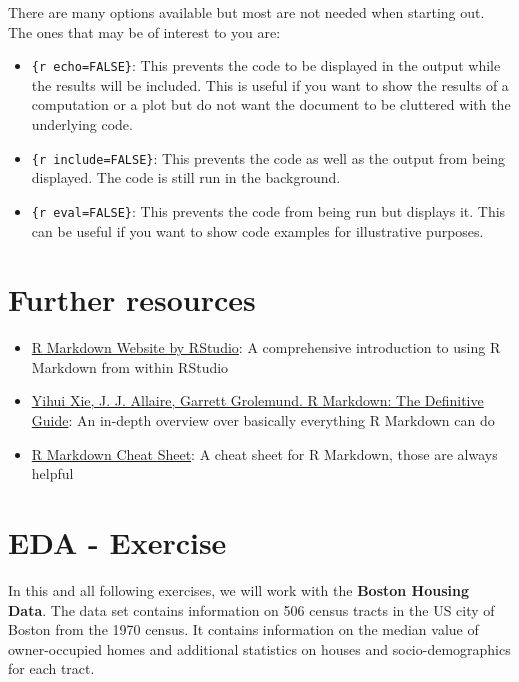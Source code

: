 \documentclass[
]{book}
\providecommand{\tightlist}{%
  \setlength{\itemsep}{0pt}\setlength{\parskip}{0pt}}
\begin{document}
There are many options available but most are not needed when starting out. The ones that may be of interest to you are:

\begin{itemize}
\tightlist
\item
  \texttt{\{r\ echo=FALSE\}}: This prevents the code to be displayed in the output while the results will be included. This is useful if you want to show the results of a computation or a plot but do not want the document to be cluttered with the underlying code.
\item
  \texttt{\{r\ include=FALSE\}}: This prevents the code as well as the output from being displayed. The code is still run in the background.
\item
  \texttt{\{r\ eval=FALSE\}}: This prevents the code from being run but displays it. This can be useful if you want to show code examples for illustrative purposes.
\end{itemize}

\hypertarget{further-resources-1}{%
\section{Further resources}\label{further-resources-1}}

\begin{itemize}
\tightlist
\item
  \href{https://rmarkdown.rstudio.com/lesson-1.html}{R Markdown Website by RStudio}: A comprehensive introduction to using R Markdown from within RStudio
\item
  \href{https://bookdown.org/yihui/rmarkdown/}{Yihui Xie, J. J. Allaire, Garrett Grolemund. R Markdown: The Definitive Guide}: An in-depth overview over basically everything R Markdown can do
\item
  \href{https://rstudio.github.io/cheatsheets/rmarkdown.pdf}{R Markdown Cheat Sheet}: A cheat sheet for R Markdown, those are always helpful
\end{itemize}

\hypertarget{eda---exercise}{%
\section{EDA - Exercise}\label{eda---exercise}}

In this and all following exercises, we will work with the \textbf{Boston Housing Data}. The data set contains information on 506 census tracts in the US city of Boston from the 1970 census. It contains information on the median value of owner-occupied homes and additional statistics on houses and socio-demographics for each tract.
\end{document}

